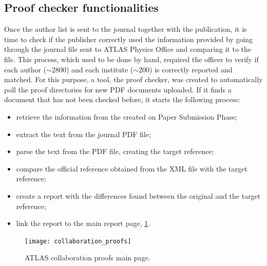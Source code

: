 \subsection{Proof checker functionalities}
\label{sec:Proof_checker_functionalities}

Once the author list is sent to the journal together with the publication,
it is time to check if the publisher correctly used the information provided by going through the journal  file sent to ATLAS Physics Office and comparing it to the  file.
This process, which used to be done by hand, required the officer to verify if each author ($\sim$2800) and each institute ($\sim$200) is correctly reported and matched.
For this purpose, a tool, the proof checker, was created to automatically poll the proof directories for new PDF documents uploaded.
If it finds a document that has not been checked before, it starts the following process:

\begin{itemize}
\item retrieve the information from the  created on Paper Submission Phase;
\item extract the text from the journal PDF file;
\item parse the text from the PDF file, creating the target reference;
\item compare the official reference obtained from the XML file with the target reference;
\item create a report with the differences found between the original and the target reference;
\item link the report to the main report page, \cref{fig:collaboration_proofs}.
\end{itemize}

\begin{figure}[htb]
  \centering
  \texttt{[image: collaboration\_proofs]}
  \caption{ATLAS collaboration proofs main page.
    }
  \label{fig:collaboration_proofs}
\end{figure}


